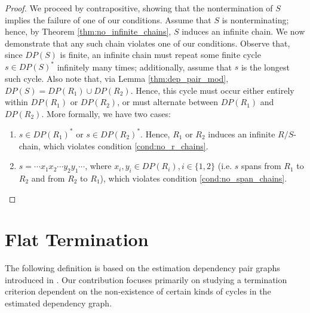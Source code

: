 \documentclass{article}
\theoremstyle{definition}
\begin{document}
\begin{proof}
    We proceed by contrapositive, showing that the nontermination of $S$ implies the failure of one of our conditions. Assume that $S$ is nonterminating; hence, by Theorem \ref{thm:no_infinite_chains}, $S$ induces an infinite chain. We now demonstrate that any such chain violates one of our conditions. Observe that, since $DP(S)$ is finite, an infinite chain must repeat some finite cycle $s \in DP(S)^*$ infinitely many times; additionally, assume that $s$ is the longest such cycle. Also note that, via Lemma \ref{thm:dep_pair_mod}, $DP(S) = DP(R_1) \cup DP(R_2)$. Hence, this cycle must occur either entirely within $DP(R_1)$ or $DP(R_2)$, or must alternate between $DP(R_1)$ and $DP(R_2)$. More formally, we have two cases: \begin{enumerate}
        \item $s \in DP(R_1)^*$ or  $s \in DP(R_2)^*$. Hence, $R_1$ or $R_2$ induces an infinite $R/S$-chain, which violates condition \eqref{cond:no_r_chains}. 
        
        \item $s = \cdots x_1 x_2 \cdots y_2 y_1 \cdots$, where $x_i, y_i \in DP(R_i), i \in \{1, 2\}$ (i.e. $s$ spans from $R_1$ to $R_2$ and from $R_2$ to $R_1$), which violates condition \eqref{cond:no_span_chains}. 
    \end{enumerate}
\end{proof}



\section{Flat Termination}

The following definition is based on the estimation dependency pair graphs introduced in \cite{arts2000dependency}. Our contribution focuses primarily on studying a termination criterion dependent on the non-existence of certain kinds of cycles in the estimated dependency graph.
\end{document}
